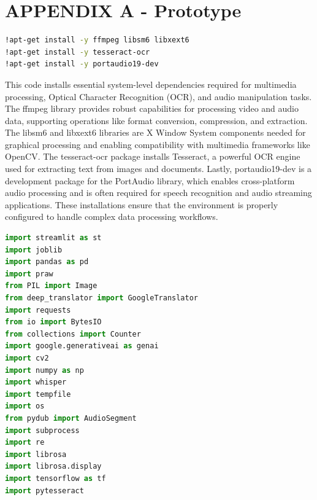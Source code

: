 

\section*{APPENDIX A - Prototype \label{sec:proto}}

\begin{tcolorbox}[colback=gray!5!white, colframe=gray!80!black, boxrule=0.5pt, title=System Dependencies Installation]
    \begin{lstlisting}[language=Bash]
!apt-get install -y ffmpeg libsm6 libxext6
!apt-get install -y tesseract-ocr
!apt-get install -y portaudio19-dev
    \end{lstlisting}
\end{tcolorbox}

\noindent
This code installs essential system-level dependencies required for multimedia processing, Optical Character Recognition (OCR), and audio manipulation tasks. The ffmpeg library provides robust capabilities for processing video and audio data, supporting operations like format conversion, compression, and extraction. The libsm6 and libxext6 libraries are X Window System components needed for graphical processing and enabling compatibility with multimedia frameworks like OpenCV. The tesseract-ocr package installs Tesseract, a powerful OCR engine used for extracting text from images and documents. Lastly, portaudio19-dev is a development package for the PortAudio library, which enables cross-platform audio processing and is often required for speech recognition and audio streaming applications. These installations ensure that the environment is properly configured to handle complex data processing workflows.


\begin{tcolorbox}[colback=gray!5!white, colframe=gray!80!black, boxrule=0.5pt, title=Import Libraries]
    \begin{lstlisting}[language=Python]
import streamlit as st
import joblib
import pandas as pd
import praw
from PIL import Image
from deep_translator import GoogleTranslator
import requests
from io import BytesIO
from collections import Counter
import google.generativeai as genai
import cv2
import numpy as np
import whisper
import tempfile
import os
from pydub import AudioSegment
import subprocess
import re
import librosa
import librosa.display
import tensorflow as tf
import pytesseract
    \end{lstlisting}
\end{tcolorbox}

